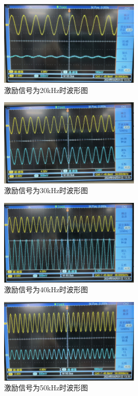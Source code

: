 \documentclass{article}
\begin{document}
\begin{figure}[htbp]
   \centering
   \includegraphics[width=0.6\textwidth]{20k.jpeg}
   \caption{激励信号为20kHz时波形图}
\end{figure}

\begin{figure}[htbp]
   \centering
   \includegraphics[width=0.6\textwidth]{30k.jpeg}
   \caption{激励信号为30kHz时波形图}
\end{figure}

\begin{figure}[htbp]
   \centering
   \includegraphics[width=0.6\textwidth]{40k.jpeg}
   \caption{激励信号为40kHz时波形图}
\end{figure}

\begin{figure}[htbp]
   \centering
   \includegraphics[width=0.6\textwidth]{50k.jpeg}
   \caption{激励信号为50kHz时波形图}
\end{figure}
\end{document}
